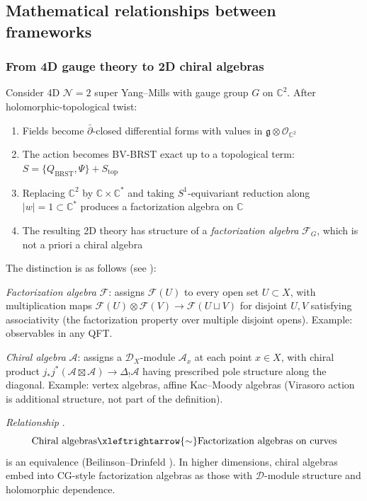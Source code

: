 \subsection{Mathematical relationships between frameworks}
\label{sec:precise-relationships-frameworks}

\subsubsection{From 4D gauge theory to 2D chiral algebras}

\begin{theorem}\label{thm:costello-li-reduction}
\cite{CL16} Consider 4D $\mathcal{N}=2$ super Yang--Mills with gauge group $G$
on $\mathbb{C}^2$. After holomorphic-topological twist:
\begin{enumerate}
\item Fields become $\bar{\partial}$-closed differential forms with values in
 $\mathfrak{g} \otimes \mathcal{O}_{\mathbb{C}^2}$

\item The action becomes BV-BRST exact up to a topological term: $S = \{Q_{\text{BRST}}, \Psi\} + S_{\mathrm{top}}$

\item Replacing $\mathbb{C}^2$ by $\mathbb{C} \times \mathbb{C}^*$ and taking $S^1$-equivariant reduction along $|w| = 1 \subset \mathbb{C}^*$
 produces a factorization algebra on $\mathbb{C}$

\item The resulting 2D theory has structure of a \emph{factorization algebra}
 $\mathcal{F}_G$, which is not a priori a chiral algebra
\end{enumerate}
\end{theorem}

\begin{remark}\label{rem:fact-vs-chiral}
The distinction is as follows (see ):

\emph{Factorization algebra} $\mathcal{F}$: assigns $\mathcal{F}(U)$ to every open set $U \subset X$, with multiplication maps $\mathcal{F}(U) \otimes \mathcal{F}(V) \to \mathcal{F}(U \sqcup V)$ for disjoint $U, V$ satisfying associativity (the factorization property over multiple disjoint opens). Example: observables in any QFT.

\emph{Chiral algebra} $\mathcal{A}$: assigns a $\mathcal{D}_X$-module $\mathcal{A}_x$ at each point $x \in X$, with chiral product $j_*j^*(\mathcal{A} \boxtimes \mathcal{A}) \to \Delta_!\mathcal{A}$ having prescribed pole structure along the diagonal. Example: vertex algebras, affine Kac--Moody algebras (Virasoro action is additional structure, not part of the definition).

\emph{Relationship} \cite{BD04,CG17}.
\[\text{Chiral algebras} \xleftrightarrow{\sim} \text{Factorization algebras on curves}\]
is an equivalence (Beilinson--Drinfeld \cite[Theorem~3.4.9]{BD04}). In higher dimensions, chiral algebras embed into CG-style factorization algebras as those with $\mathcal{D}$-module structure and holomorphic dependence.
\end{remark}

